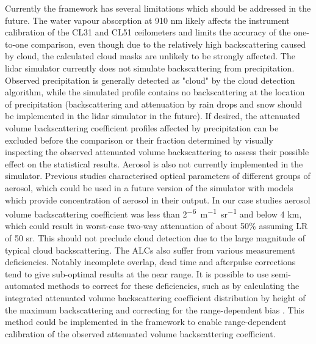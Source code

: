 Currently the framework has several limitations which should be addressed
in the future. The water vapour absorption at 910 nm likely affects
the instrument calibration of the CL31 and CL51 ceilometers and limits the accuracy of the one-to-one comparison,
even though due to the relatively high backscattering caused by cloud,
the calculated cloud masks are unlikely to be strongly affected. The lidar
simulator currently does not simulate backscattering from precipitation.
Observed precipitation is generally detected as "cloud" by the cloud
detection algorithm, while the simulated profile contains no backscattering
at the location of precipitation (backscattering and attenuation by rain drops
and snow should be implemented in the lidar simulator in the future).
If desired, the attenuated volume backscattering coefficient profiles affected
by precipitation can be excluded before the comparison or their fraction
determined by visually inspecting the observed attenuated volume backscattering to assess their
possible effect on the statistical results.
Aerosol is also not currently implemented in the simulator. Previous studies
\citep{chan2018} characterised optical parameters of different groups
of aerosol, which could be used in a future version of the simulator with
models which provide concentration of aerosol in their output. In our case
studies
aerosol volume backscattering coefficient was less than 2\unit{^{-6}m^{-1}sr^{-1}}
and below 4 km, which could result in worst-case two-way attenuation of about 50\%
assuming LR of 50 sr. This should not preclude cloud detection due to the large
magnitude of typical cloud backscattering.
The ALCs also suffer from various measurement
deficiencies. Notably incomplete overlap, dead time and afterpulse
corrections tend to give sub-optimal results at the near range. It is possible
to use semi-automated methods to correct for these deficiencies, such as
by calculating the integrated attenuated volume backscattering coefficient distribution by height of the maximum backscattering and correcting
for the range-dependent bias \citep[Sect. 5.1]{hopkin2019}. This method could be
implemented in the framework to enable range-dependent calibration of the
observed attenuated volume backscattering coefficient.

